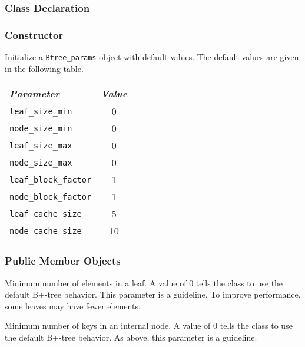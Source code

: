 \subsubsection{Class Declaration}

\btabb

   {}

\etabb

\subsubsection{Constructor}

\btabb

   {Initialize a {\tt Btree\_params} object with
  default values. The default values are given in the following table.\\[1mm]
  \begin{tabular}{|l|c|}
    \hline
    {\em Parameter} & {\em Value} \\ \hline
    {\tt leaf\_size\_min} & 0 \\ \hline
    {\tt node\_size\_min} & 0 \\ \hline
    {\tt leaf\_size\_max} & 0 \\ \hline
    {\tt node\_size\_max} & 0 \\ \hline
    {\tt leaf\_block\_factor} & 1 \\ \hline
    {\tt node\_block\_factor} & 1 \\ \hline
    {\tt leaf\_cache\_size} & 5 \\ \hline
    {\tt node\_cache\_size} & 10 \\ \hline
  \end{tabular}
  }

\etabb

\subsubsection{Public Member Objects}

\btabb

   {Minimum number of elements in a leaf. A
  value of $0$ tells the class to use the default B+-tree behavior. This
  parameter is a guideline. To improve performance, some leaves may have
  fewer elements.}

   {Minimum number of keys in an internal
  node. A value of $0$ tells the class to use the default B+-tree
  behavior. As above, this parameter is a guideline.}

